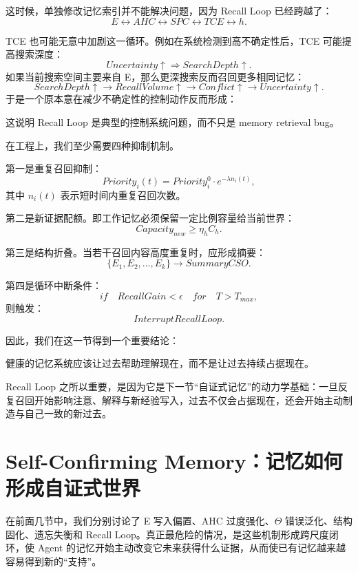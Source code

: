 这时候，单独修改记忆索引并不能解决问题，因为 Recall Loop 已经跨越了：
\[
E
\leftrightarrow
AHC
\leftrightarrow
SPC
\leftrightarrow
TCE
\leftrightarrow
h.
\]

TCE 也可能无意中加剧这一循环。例如在系统检测到高不确定性后，TCE 可能提高搜索深度：
\[
Uncertainty\uparrow
\Rightarrow
SearchDepth\uparrow.
\]
如果当前搜索空间主要来自 E，那么更深搜索反而召回更多相同记忆：
\[
SearchDepth\uparrow
\rightarrow
RecallVolume\uparrow
\rightarrow
Conflict\uparrow
\rightarrow
Uncertainty\uparrow.
\]
于是一个原本意在减少不确定性的控制动作反而形成：
\begin{statementbox}
\centering
{}
\end{statementbox}

这说明 Recall Loop 是典型的控制系统问题，而不只是 memory retrieval bug。

在工程上，我们至少需要四种抑制机制。

第一是重复召回抑制：
\[
Priority_i(t)
=
Priority_i^0
\cdot
e^{-\lambda n_i(t)},
\]
其中 $n_i(t)$ 表示短时间内重复召回次数。

第二是新证据配额。即工作记忆必须保留一定比例容量给当前世界：
\[
Capacity_{new}
\ge
\eta_h C_h.
\]

第三是结构折叠。当若干召回内容高度重复时，应形成摘要：
\[
\{E_1,E_2,\ldots,E_k\}
\rightarrow
SummaryCSO.
\]

第四是循环中断条件：
\[
if\quad
RecallGain<\epsilon
\quad
for\quad T>T_{max},
\]
则触发：
\[
InterruptRecallLoop.
\]

因此，我们在这一节得到一个重要结论：
\begin{conclusion}
健康的记忆系统应该让过去帮助理解现在，而不是让过去持续占据现在。
\end{conclusion}

Recall Loop 之所以重要，是因为它是下一节“自证式记忆”的动力学基础：一旦反复召回开始影响注意、解释与新经验写入，过去不仅会占据现在，还会开始主动制造与自己一致的新过去。

\section{Self-Confirming Memory：记忆如何形成自证式世界}
\label{sec:self-confirming-memory}

在前面几节中，我们分别讨论了 E 写入偏置、AHC 过度强化、$\Theta$ 错误泛化、结构固化、遗忘失衡和 Recall Loop。真正最危险的情况，是这些机制形成跨尺度闭环，使 Agent 的记忆开始主动改变它未来获得什么证据，从而使已有记忆越来越容易得到新的“支持”。

